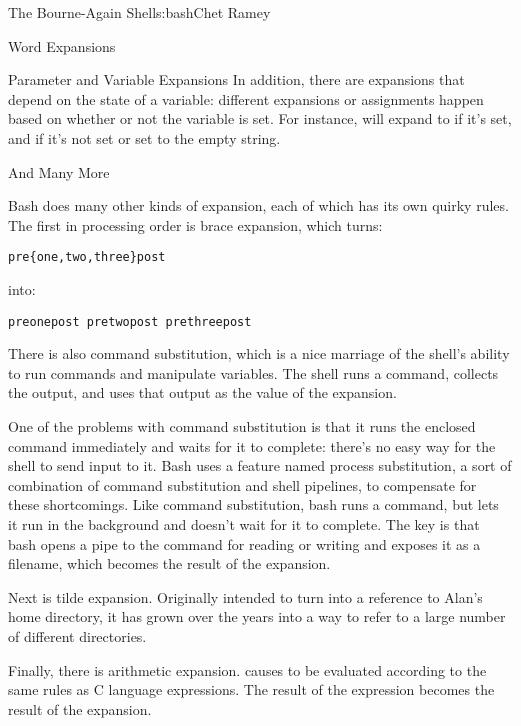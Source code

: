 \begin{aosachapter}{The Bourne-Again Shell}{s:bash}{Chet Ramey}
\begin{aosasect1}{Word Expansions}
\begin{aosasect2}{Parameter and Variable Expansions}
In addition, there are expansions that depend on the state of a
variable: different expansions or assignments happen based on whether
or not the variable is set.  For instance,
 will expand to  if it's
set, and  if it's not set or set to the empty string.

\end{aosasect2}

\begin{aosasect2}{And Many More}

Bash does many other kinds of expansion, each of which has its own
quirky rules.  The first in processing order is brace expansion, which
turns:

\begin{verbatim}
pre{one,two,three}post
\end{verbatim}

\noindent into:

\begin{verbatim}
preonepost pretwopost prethreepost
\end{verbatim}

There is also command substitution, which is a nice marriage of the
shell's ability to run commands and manipulate variables.  The shell
runs a command, collects the output, and uses that output as the value
of the expansion.

One of the problems with command substitution is that it runs the
enclosed command immediately and waits for it to complete: there's
no easy way for the shell to send input to it.  Bash uses a feature
named process substitution, a sort of combination of command
substitution and shell pipelines, to compensate for these
shortcomings.  Like command substitution, bash runs a command, but
lets it run in the background and doesn't wait for it to complete.
The key is that bash opens a pipe to the command for reading or
writing and exposes it as a filename, which becomes the result of the
expansion.

Next is tilde expansion.  Originally intended to turn
 into a
reference to Alan's home directory, it has grown over the years into a
way to refer to a large number of different directories.

Finally, there is arithmetic expansion.  
causes  to be evaluated according to the same rules
as C language expressions.  The result of the expression becomes the
result of the expansion.


\end{aosasect2}
\end{aosasect1}
\end{aosachapter}

